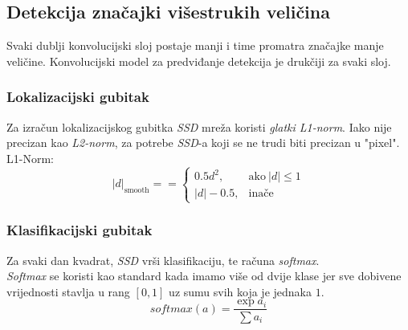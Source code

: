 \subsection{Detekcija značajki višestrukih veličina}
Svaki dublji konvolucijski sloj postaje manji i time promatra značajke manje veličine.
Konvolucijski model za predviđanje detekcija je drukčiji za svaki sloj.
\subsubsection{Lokalizacijski gubitak}
Za izračun lokalizacijskog gubitka \emph{SSD} mreža koristi \emph{glatki L1-norm}.
Iako nije precizan kao \emph{L2-norm}, za potrebe \emph{SSD}-a koji se ne trudi biti precizan u "pixel". \\
L1-Norm: 
$$| d |_{\text{smooth}} = =   \begin{cases} 0.5 d^2, & \text{ako}\ | d  | \leq 1 \\ | d | - 0.5, & \text{inače} \end{cases} $$
\subsubsection{Klasifikacijski gubitak}
Za svaki dan kvadrat, \emph{SSD} vrši klasifikaciju, te računa \emph{softmax}. \\
\emph{Softmax} se koristi kao standard kada imamo više od dvije klase jer sve dobivene vrijednosti stavlja u rang $[0, 1]$ uz sumu svih koja je jednaka $1$.
$$softmax(a)=\frac{\exp{a_i}}{\sum{a_i}}$$
